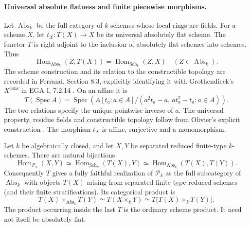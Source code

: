\paragraph{Universal absolute flatness and finite piecewise morphisms.}

Let $\operatorname{Abs}_k$ be the full category of $k$-schemes whose
local rings are fields.  For a scheme $X$, let $t_X:T(X)\to X$ be its
universal absolutely flat scheme.  The functor $T$ is right adjoint to
the inclusion of absolutely flat schemes into schemes.  Thus
\[
 \operatorname{Hom}_{\operatorname{Abs}_k}(Z,T(X))
   =\operatorname{Hom}_{\operatorname{Sch}_k}(Z,X)
 \quad (Z\in\operatorname{Abs}_k).
\]
The scheme construction and its relation to the constructible topology
are recorded in Ferrand, Section 8.3, explicitly identifying it with
Grothendieck's $X^{\mathrm{cons}}$ in EGA I, 7.2.14
\cite{ROOT_Ferrand2003,ROOT_EGAI1971}.  On an affine it is
\[
 T(\operatorname{Spec}A)=\operatorname{Spec}
 \left(A[t_a:a\in A]/(a^2t_a-a,\,at_a^2-t_a:a\in A)\right).
\]
The two relations specify the unique pointwise inverse of $a$.
The universal property, residue fields and constructible topology follow
from Olivier's explicit construction
\cite[expos\'e 6]{ROOT_Olivier1968}\cite[Sections 1--3]{ROOT_Olivier1978}.
The morphism $t_X$ is affine, surjective and a monomorphism.

\begin{theorem}\label{C:absolute-flat-piecewise}
Let $k$ be algebraically closed, and let $X,Y$ be separated reduced
finite-type $k$-schemes.  There are natural bijections
\[
 \operatorname{Hom}_{\mathcal P_k}(X,Y)
 \simeq \operatorname{Hom}_{\operatorname{Sch}_k}(T(X),Y)
 \simeq \operatorname{Hom}_{\operatorname{Abs}_k}(T(X),T(Y)).
\]
Consequently $T$ gives a fully faithful realization of $\mathcal P_k$
as the full subcategory of $\operatorname{Abs}_k$ with objects $T(X)$
arising from separated finite-type reduced schemes (and their finite stratifications).
Its categorical product is
\[
 T(X)\mathbin{\times_{\operatorname{Abs}_k}}T(Y)
   \simeq T(X\times_kY)
   \simeq T\bigl(T(X)\times_kT(Y)\bigr).
\]
The product occurring inside the last $T$ is the ordinary scheme product.
It need not itself be absolutely flat.
\end{theorem}

